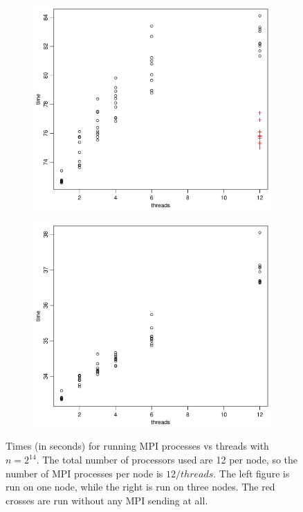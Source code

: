 \begin{figure}[h!]
  \centering
  \begin{subfigure}[b]{0.48\textwidth}
    \includegraphics[width=\textwidth]{./Figures/taskc1.pdf}
  \end{subfigure}%
  \quad
  \begin{subfigure}[b]{0.48\textwidth}
    \includegraphics[width=\textwidth]{./Figures/taskc2.pdf}
  \end{subfigure}
  \vspace{-0.1\baselineskip}
  \caption{Times (in seconds) for running MPI processes vs threads with $n = 2^{14}$. The total number of processors used are 12 per node, so the number of MPI processes per node is $12 / threads$. The left figure is run on one node, while the right is run on three nodes. The red crosses are run without any MPI sending at all.}
  \label{fig:taskc}
\end{figure}
\\
